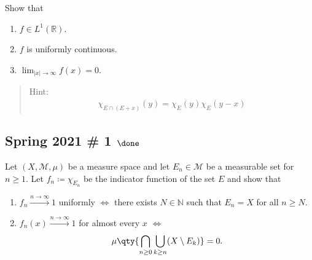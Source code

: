 Show that

\begin{enumerate}
\def\labelenumi{\arabic{enumi}.}
\tightlist
\item
  \(f\in L^1({\mathbb{R}})\).
\item
  \(f\) is uniformly continuous.
\item
  \(\lim _{|x| \to \infty} f(x) = 0\).
\end{enumerate}

\begin{quote}
Hint:
\begin{align*}
\chi_{E \cap(E+x)}(y)=\chi_{E}(y) \chi_{E}(y-x)
\end{align*}
\end{quote}

\hypertarget{spring-2021-1-done}{%
\subsection{\texorpdfstring{Spring 2021 \# 1
\(\done\)}{Spring 2021 \# 1 \textbackslash done}}\label{spring-2021-1-done}}

\begin{problem}[Spring 2021, 1]

Let \((X, \mathcal{M},\mu)\) be a measure space and let
\(E_n \in \mathcal{M}\) be a measurable set for \(n\geq 1\). Let
\(f_n \coloneqq\chi_{E_n}\) be the indicator function of the set \(E\)
and show that

\begin{enumerate}
\def\labelenumi{\alph{enumi}.}
\item
  \(f_n \overset{n\to\infty}\to 1\) uniformly \(\iff\) there exists
  \(N\in {\mathbb{N}}\) such that \(E_n = X\) for all \(n\geq N\).
\item
  \(f_n(x) \overset{n\to\infty}\to 1\) for almost every \(x\) \(\iff\)
  \begin{align*}
  \mu \qty{ \displaystyle\bigcap_{n \geq 0} \displaystyle\bigcup_{k \geq n} (X \setminus E_k) } = 0
  .\end{align*}
\end{enumerate}

\end{problem}

